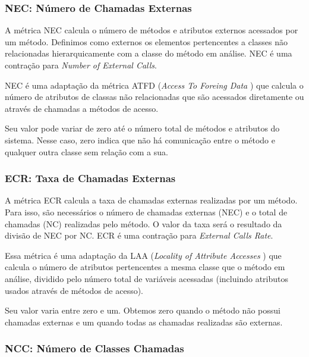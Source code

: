 \subsubsection{NEC: Número de Chamadas Externas}

	A métrica NEC calcula o número de métodos e atributos externos acessados por um método. Definimos como externos os elementos pertencentes a classes não relacionadas hierarquicamente com a classe do método em análise. NEC é uma contração para \textit{Number of External Calls}.
	                                               
	NEC é uma adaptação da métrica ATFD (\textit{Access To Foreing Data} \citep{Marinescu02}) que calcula o número de atributos de classas não relacionadas que são acessados diretamente ou através de chamadas a métodos de acesso. 
	
	Seu valor pode variar de zero até o número total de métodos e atributos do sistema. Nesse caso, zero indica que não há comunicação entre o método e qualquer outra classe sem relação com a sua.
	
                          

\subsubsection{ECR: Taxa de Chamadas Externas}
                                         
	A métrica ECR calcula a taxa de chamadas externas realizadas por um método. Para isso, são necessários o número de chamadas externas (NEC) e o total de chamadas (NC) realizadas pelo método. O valor da taxa será o resultado da divisão de NEC por NC. ECR é uma contração para \textit{External Calls Rate}.
	
	Essa métrica é uma adaptação da LAA (\textit{Locality of Attribute Accesses} \citep{Lanza06}) que calcula o número de atributos pertencentes a mesma classe que o método em análise, dividido pelo número total de variáveis acessadas (incluindo atributos usados através de métodos de acesso). 
	
	Seu valor varia entre zero e um. Obtemos zero quando o método não possui chamadas externas e um quando todas as chamadas realizadas são externas.
	
	
	
\subsubsection{NCC: Número de Classes Chamadas}              
                                                                 
